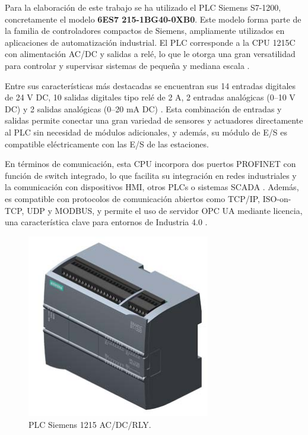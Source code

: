 Para la elaboración de este trabajo se ha utilizado el PLC Siemens S7-1200, concretamente el modelo \textbf{6ES7 215-1BG40-0XB0}. Este modelo forma parte de la familia de controladores compactos de Siemens, ampliamente utilizados en aplicaciones de automatización industrial. El PLC corresponde a la CPU 1215C con alimentación AC/DC y salidas a relé, lo que le otorga una gran versatilidad para controlar y supervisar sistemas de pequeña y mediana escala \cite{PLC_siemens}.

Entre sus características más destacadas se encuentran sus 14 entradas digitales de 24 V DC, 10 salidas digitales tipo relé de 2 A, 2 entradas analógicas (0–10 V DC) y 2 salidas analógicas (0–20 mA DC) \cite{PLC_siemens}. Esta combinación de entradas y salidas permite conectar una gran variedad de sensores y actuadores directamente al PLC sin necesidad de módulos adicionales, y además, su módulo de E/S es compatible eléctricamente con las E/S de las estaciones.

En términos de comunicación, esta CPU incorpora dos puertos PROFINET con función de switch integrado, lo que facilita su integración en redes industriales y la comunicación con dispositivos HMI, otros PLCs o sistemas SCADA \cite{PLC_siemens}. Además, es compatible con protocolos de comunicación abiertos como TCP/IP, ISO-on-TCP, UDP y MODBUS, y permite el uso de servidor OPC UA mediante licencia, una característica clave para entornos de Industria 4.0 \cite{PLC_siemens}.

\begin{figure} [h!]
  \begin{center}
    \includegraphics[width=8cm]{figs/PLC_siemens}
  \end{center}
  \caption{\centering PLC Siemens 1215 AC/DC/RLY. \cite{PLC_siemens}}
  \label{fig:PLC_siemens}
\end{figure} 

